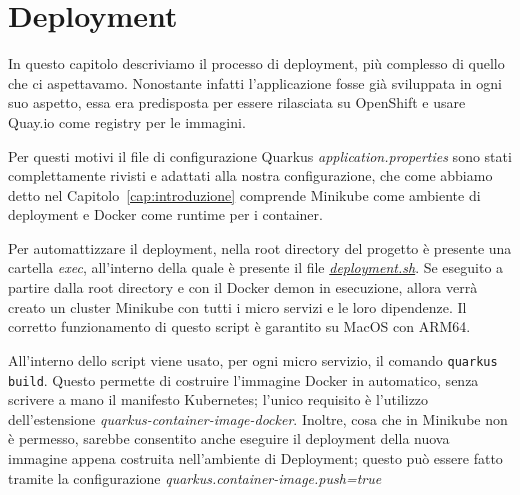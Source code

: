 \chapter{Deployment}
\label{cap:deployment}
In questo capitolo descriviamo il processo di deployment, più complesso di quello che ci aspettavamo. Nonostante infatti l'applicazione fosse già sviluppata in ogni suo aspetto, essa era predisposta per essere rilasciata su OpenShift e usare Quay.io come registry per le immagini.

Per questi motivi il file di configurazione Quarkus \textit{application.properties} sono stati complettamente rivisti e adattati alla nostra configurazione, che come abbiamo detto nel Capitolo~\ref{cap:introduzione} comprende Minikube come ambiente di deployment e Docker come runtime per i container.

\myskip

Per automattizzare il deployment, nella root directory del progetto è presente una cartella \textit{exec}, all'interno della quale è presente il file \href{https://github.com/edoardosarri24/quarkus-car-rental/blob/master/exec/deployment.sh}{\textit{deployment.sh}}. Se eseguito a partire dalla root directory e con il Docker demon in esecuzione, allora verrà creato un cluster Minikube con tutti i micro servizi e le loro dipendenze. Il corretto funzionamento di questo script è garantito su MacOS con ARM64.

All'interno dello script viene usato, per ogni micro servizio, il comando \texttt{quarkus build}. Questo permette di costruire l'immagine Docker in automatico, senza scrivere a mano il manifesto Kubernetes; l'unico requisito è l'utilizzo dell'estensione \textit{quarkus-container-image-docker}. Inoltre, cosa che in Minikube non è permesso, sarebbe consentito anche eseguire il deployment della nuova immagine appena costruita nell'ambiente di Deployment; questo può essere fatto tramite la configurazione \textit{quarkus.container-image.push=true}

